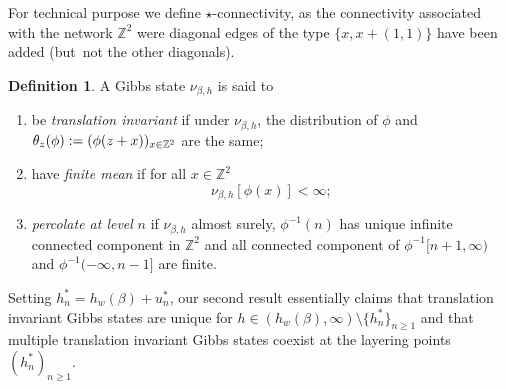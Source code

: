 \documentclass[JEP,XML,SOM,Unicode, NoFloatCountersInSection]{cedram}
\newenvironment{enumeratei}
{\bgroup\def\theenumi{\roman{enumi}}\def\theenumii{\Alph{enumii}}\begin{enumerate}}
{\end{enumerate}\egroup}
\numberwithin{equation}{section}
\theoremstyle{plain}
\theoremstyle{definition}
\newtheorem{definition}[theorem]{Definition}
\newcommand{\bbZ}{{\ensuremath{\mathbb Z}} }
\newcommand{\gb}{\beta}
\begin{document}
For technical purpose we define $\star$-connectivity, as the connectivity associated with the network $\bbZ^2$ were diagonal edges of the type
$\{x,x+(1,1)\}$ have been added (but~not the other diagonals).

\begin{definition}
A Gibbs state $\nu_{\gb,h}$ is said to
\begin{enumeratei}
\item
be \textit{translation invariant} if under $\nu_{\gb,h}$, the distribution of $\phi$ and $\theta_z(\phi):= (\phi(z+\nobreak x))_{x\in \bbZ^2}$
are the same;
\item
have \textit{finite mean} if for all $x\in \bbZ^2$
\begin{equation*}%
\nu_{\gb,h}\left[ \phi(x) \right]<\infty;
\end{equation*}
\item
\textit{percolate at level} $n$ if $\nu_{\gb,h}$ almost surely, $\phi^{-1}(n)$ has unique infinite connected component in $\bbZ^2$
and all connected component of $\phi^{-1}[n+1,\infty)$ and $\phi^{-1}(-\infty,n-1]$ are finite.
\end{enumeratei}
\end{definition}

Setting $h^*_n=h_w(\gb)+u^*_n$,
our second result essentially claims that translation invariant Gibbs states are unique for $h\in (h_w(\gb),\infty)\setminus \{h^*_n\}_{n\ge 1}$
and that multiple translation invariant Gibbs states coexist at the layering points $(h^*_n)_{n\ge 1}$.
\end{document}
